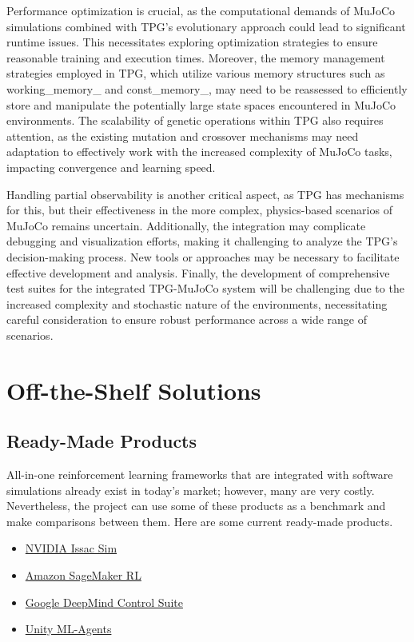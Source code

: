 \documentclass[12pt]{article}
\newcommand{\lips}{\textit{Insert your content here.}}
\begin{document}
Performance optimization is crucial, as the computational demands of MuJoCo simulations combined with TPG's evolutionary approach could lead to significant runtime issues. This necessitates exploring optimization strategies to ensure reasonable training and execution times. Moreover, the memory management strategies employed in TPG, which utilize various memory structures such as working\_memory\_ and const\_memory\_, may need to be reassessed to efficiently store and manipulate the potentially large state spaces encountered in MuJoCo environments. The scalability of genetic operations within TPG also requires attention, as the existing mutation and crossover mechanisms may need adaptation to effectively work with the increased complexity of MuJoCo tasks, impacting convergence and learning speed.

Handling partial observability is another critical aspect, as TPG has mechanisms for this, but their effectiveness in the more complex, physics-based scenarios of MuJoCo remains uncertain. Additionally, the integration may complicate debugging and visualization efforts, making it challenging to analyze the TPG's decision-making process. New tools or approaches may be necessary to facilitate effective development and analysis. Finally, the development of comprehensive test suites for the integrated TPG-MuJoCo system will be challenging due to the increased complexity and stochastic nature of the environments, necessitating careful consideration to ensure robust performance across a wide range of scenarios.

\section{Off-the-Shelf Solutions}
\subsection{Ready-Made Products}

All-in-one reinforcement learning frameworks that are integrated with software simulations already exist in today’s market; however, many are very costly. Nevertheless, the project can use some of these products as a benchmark and make comparisons between them. Here are some current ready-made products.
\begin{itemize}
  \item \href{https://developer.nvidia.com/isaac/sim}{NVIDIA Issac Sim}
  \item \href{https://aws.amazon.com/sagemaker/}{Amazon SageMaker RL}
  \item \href{https://github.com/google-deepmind/dm_control?tab=readme-ov-file}{Google DeepMind Control Suite}
  \item \href{https://github.com/Unity-Technologies/ml-agents}{Unity ML-Agents}
\end{itemize}
\end{document}
